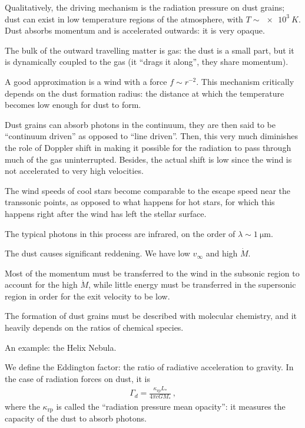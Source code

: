 \documentclass[main.tex]{subfiles}
\begin{document}
Qualitatively, the driving mechanism is the radiation pressure on dust grains; dust can exist in low temperature regions of the atmosphere, with \(T \sim \SI{e3}{K}\). 
Dust absorbs momentum and is accelerated outwards: it is very opaque. 

The bulk of the outward travelling matter is gas: the dust is a small part, but it is dynamically coupled to the gas (it ``drags it along'', they share momentum). 

A good approximation is a wind with a force \(f \sim r^{-2}\). 
This mechanism critically depends on the dust formation radius: the distance at which the temperature becomes low enough for dust to form. 

Dust grains can absorb photons in the continuum, they are then said to be ``continuum driven'' as opposed to ``line driven''. 
Then, this very much diminishes the role of Doppler shift in making it possible for the radiation to pass through much of the gas uninterrupted. 
Besides, the actual shift is low since the wind is not accelerated to very high velocities.

The wind speeds of cool stars become comparable to the escape speed near the transsonic points, as opposed to what happens for hot stars, for which this happens right after the wind has left the stellar surface.

The typical photons in this process are infrared, on the order of \(\lambda \sim \SI{1}{\micro\metre}\). 

The dust causes significant reddening. We have low \(v _{ \infty }\) and high \(\dot{M}\).

Most of the momentum must be transferred to the wind in the subsonic region to account for the high \(\dot{M}\), while little energy must be transferred in the supersonic region in order for the exit velocity to be low. 

The formation of dust grains must be described with molecular chemistry, and it heavily depends on the ratios of chemical species. 

An example: the Helix Nebula. 

We define the Eddington factor: the ratio of radiative acceleration to gravity. 
In the case of radiation forces on dust, it is 
%
\begin{align} \label{eq:definition-gamma-dust}
  \Gamma_{d} = \frac{\kappa _{\text{rp}}L_{*}}{4 \pi c G M_{*}}
\,,
\end{align}
%
where the \(\kappa _{\text{rp}} \) is called the ``radiation pressure mean opacity'': it measures the capacity of the dust to absorb photons. 
\end{document}
